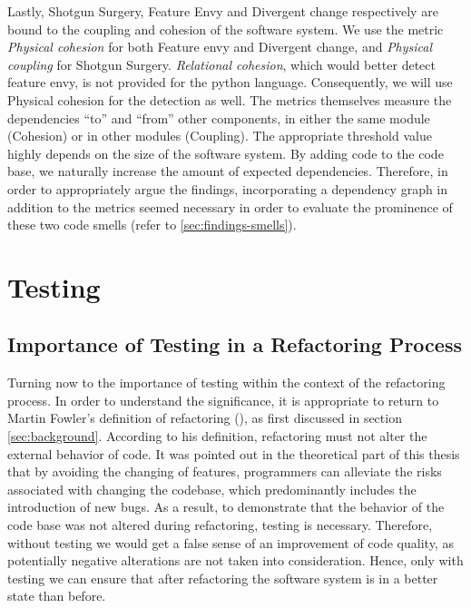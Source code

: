 Lastly, Shotgun Surgery, Feature Envy and Divergent change respectively are bound to the coupling and cohesion of the software system. We use the metric \emph{Physical cohesion} for both Feature envy and Divergent change, and \emph{Physical coupling} for Shotgun Surgery. \emph{Relational cohesion}, which would better detect feature envy, is not provided for the python language. Consequently, we will use Physical cohesion for the detection as well. The metrics themselves measure the dependencies “to” and “from” other components, in either the same module (Cohesion) or in other modules (Coupling). The appropriate threshold value highly depends on the size of the software system. By adding code to the code base, we naturally increase the amount of expected dependencies. Therefore, in order to appropriately argue the findings, incorporating a dependency graph in addition to the metrics seemed necessary in order to evaluate the prominence of these two code smells (refer to \ref{sec:findings-smells}).

\section{Testing}
\label{sec:testing}

\subsection{Importance of Testing in a Refactoring Process}

Turning now to the importance of testing within the context of the refactoring process.  In order to understand the significance, it is appropriate to return to Martin Fowler's definition of refactoring (\cite{fowler2018}), as first discussed in section \ref{sec:background}. According to his definition, refactoring must not alter the external behavior of code. It was pointed out in the theoretical part of this thesis that by avoiding the changing of features, programmers can alleviate the risks associated with changing the codebase, which predominantly includes the introduction of new bugs. As a result, to demonstrate that the behavior of the code base was not altered during refactoring, testing is necessary. Therefore, without testing we would get a false sense of an improvement of code quality, as potentially negative alterations are not taken into consideration. Hence, only with testing we can ensure that after refactoring the software system is in a better state than before.

